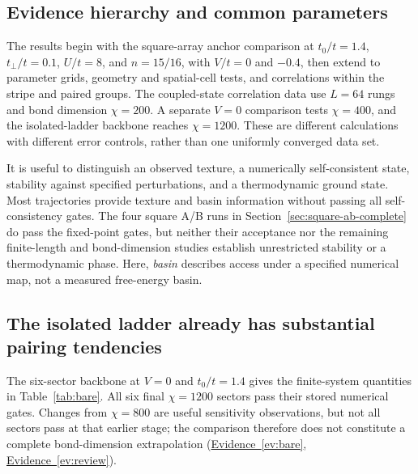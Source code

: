\documentclass[11pt,letterpaper]{article}
\newcommand{\tp}{t_{\perp}}
\newcommand{\ev}[1]{\hyperref[ev:#1]{Evidence~\ref*{ev:#1}}}
\begin{document}
\subsection{Evidence hierarchy and common parameters}

The results begin with the square-array anchor comparison at
$t_0/t=1.4$, $\tp/t=0.1$, $U/t=8$, and $n=15/16$, with $V/t=0$ and
$-0.4$, then extend to parameter grids, geometry and spatial-cell tests,
and correlations within the stripe and paired groups. The coupled-state
correlation data use $L=64$ rungs and bond dimension $\chi=200$.
A separate $V=0$ comparison tests $\chi=400$, and
the isolated-ladder backbone reaches $\chi=1200$. These are different
calculations with different error controls, rather than one uniformly
converged data set.

It is useful to distinguish an observed texture, a numerically
self-consistent state, stability against specified perturbations, and a
thermodynamic ground state. Most trajectories provide texture and basin
information without passing all self-consistency gates. The four square
A/B runs in Section~\ref{sec:square-ab-complete} do pass the fixed-point
gates, but neither their acceptance nor the remaining finite-length and
bond-dimension studies establish unrestricted stability or a thermodynamic
phase. Here, \emph{basin} describes access under a
specified numerical map, not a measured free-energy basin.

\subsection{The isolated ladder already has substantial pairing tendencies}
\label{sec:bare}

The six-sector backbone at $V=0$ and $t_0/t=1.4$ gives the finite-system
quantities in Table~\ref{tab:bare}. All six final $\chi=1200$ sectors pass
their stored numerical gates. Changes from $\chi=800$ are useful sensitivity
observations, but not all sectors pass at that earlier stage; the comparison
therefore does not constitute a complete bond-dimension extrapolation
(\ev{bare}, \ev{review}).
\end{document}
